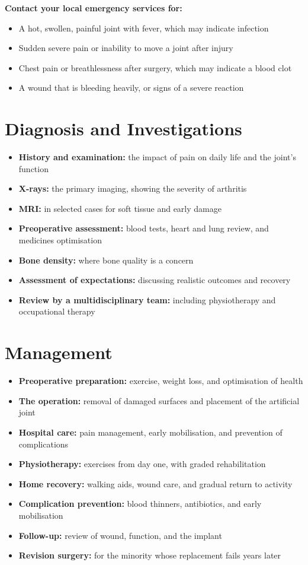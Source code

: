 \textbf{Contact your local emergency services for:}
\begin{itemize}
    \item A hot, swollen, painful joint with fever, which may indicate infection
    \item Sudden severe pain or inability to move a joint after injury
    \item Chest pain or breathlessness after surgery, which may indicate a blood clot
    \item A wound that is bleeding heavily, or signs of a severe reaction
\end{itemize}

\section*{Diagnosis and Investigations}
\begin{itemize}
    \item \textbf{History and examination:} the impact of pain on daily life and the joint's function
    \item \textbf{X-rays:} the primary imaging, showing the severity of arthritis
    \item \textbf{MRI:} in selected cases for soft tissue and early damage
    \item \textbf{Preoperative assessment:} blood tests, heart and lung review, and medicines optimisation
    \item \textbf{Bone density:} where bone quality is a concern
    \item \textbf{Assessment of expectations:} discussing realistic outcomes and recovery
    \item \textbf{Review by a multidisciplinary team:} including physiotherapy and occupational therapy
\end{itemize}

\section*{Management}
\begin{itemize}
    \item \textbf{Preoperative preparation:} exercise, weight loss, and optimisation of health
    \item \textbf{The operation:} removal of damaged surfaces and placement of the artificial joint
    \item \textbf{Hospital care:} pain management, early mobilisation, and prevention of complications
    \item \textbf{Physiotherapy:} exercises from day one, with graded rehabilitation
    \item \textbf{Home recovery:} walking aids, wound care, and gradual return to activity
    \item \textbf{Complication prevention:} blood thinners, antibiotics, and early mobilisation
    \item \textbf{Follow-up:} review of wound, function, and the implant
    \item \textbf{Revision surgery:} for the minority whose replacement fails years later
\end{itemize}

